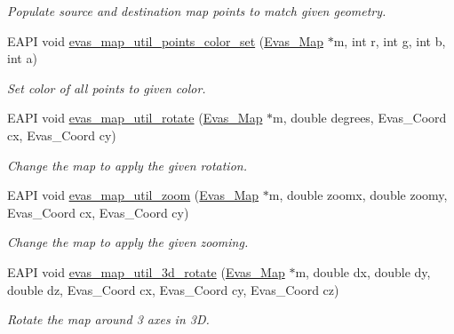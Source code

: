 \begin{DoxyCompactItemize}
\begin{DoxyCompactList}\small\item\em Populate source and destination map points to match given geometry. \item\end{DoxyCompactList}\item 
EAPI void \hyperlink{Evas_8h_a1ea4919339773a113dece07f1335d6ac}{evas\_\-map\_\-util\_\-points\_\-color\_\-set} (\hyperlink{group__Evas__Object__Group__Map_gae94fcea124ae4135e8bb15a014b334dc}{Evas\_\-Map} $\ast$m, int r, int g, int b, int a)
\begin{DoxyCompactList}\small\item\em Set color of all points to given color. \item\end{DoxyCompactList}\item 
EAPI void \hyperlink{Evas_8h_ad5bceb379d28374c62579b1969ce5080}{evas\_\-map\_\-util\_\-rotate} (\hyperlink{group__Evas__Object__Group__Map_gae94fcea124ae4135e8bb15a014b334dc}{Evas\_\-Map} $\ast$m, double degrees, Evas\_\-Coord cx, Evas\_\-Coord cy)
\begin{DoxyCompactList}\small\item\em Change the map to apply the given rotation. \item\end{DoxyCompactList}\item 
EAPI void \hyperlink{Evas_8h_a986dd1010c757910b4520527f229d3b5}{evas\_\-map\_\-util\_\-zoom} (\hyperlink{group__Evas__Object__Group__Map_gae94fcea124ae4135e8bb15a014b334dc}{Evas\_\-Map} $\ast$m, double zoomx, double zoomy, Evas\_\-Coord cx, Evas\_\-Coord cy)
\begin{DoxyCompactList}\small\item\em Change the map to apply the given zooming. \item\end{DoxyCompactList}\item 
EAPI void \hyperlink{Evas_8h_a4118dedc011bd94a35d03251c7bef5ed}{evas\_\-map\_\-util\_\-3d\_\-rotate} (\hyperlink{group__Evas__Object__Group__Map_gae94fcea124ae4135e8bb15a014b334dc}{Evas\_\-Map} $\ast$m, double dx, double dy, double dz, Evas\_\-Coord cx, Evas\_\-Coord cy, Evas\_\-Coord cz)
\begin{DoxyCompactList}\small\item\em Rotate the map around 3 axes in 3D. \item\end{DoxyCompactList}\item 

\end{DoxyCompactItemize}
